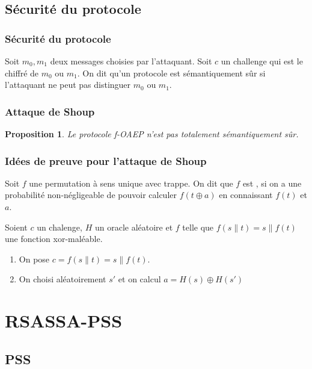 \documentclass[10pt]{beamer}
\theoremstyle{plain}
\newtheorem{proposition}[theoreme]{Proposition}
\theoremstyle{definition}
\theoremstyle{remark}
\begin{document}
\subsection{Sécurité du protocole}
\begin{frame}
\frametitle{Sécurité du protocole}
\transwipe
\begin{definition}
Soit $m_{0}, m_{1}$ deux messages choisies par l'attaquant.
Soit $c$ un challenge qui est le chiffré de $m_{0}$ ou $m_{1}$. On dit qu'un protocole est sémantiquement sûr si l'attaquant ne peut pas distinguer $m_{0}$ ou $m_{1}$.
\end{definition}
\end{frame}
\begin{frame}
\frametitle{Attaque de Shoup}
\transwipe
\begin{proposition}
	Le protocole f-OAEP n'est pas totalement sémantiquement sûr. 
\end{proposition}
\end{frame}
\begin{frame}[shrink]
\frametitle{Idées de preuve pour l'attaque de Shoup}
\transwipe
\begin{definition}
Soit $f$ une permutation à sens unique avec trappe.
On dit que $f$ est , si on a une probabilité non-négligeable de pouvoir calculer $f(t\oplus a)$ en connaissant $f(t)$ et $a$.
\end{definition}
Soient $c$ un chalenge, $H$ un oracle aléatoire et $f$ telle que $f(s\parallel t) = s\parallel f(t)$ une fonction xor-maléable.
\begin{enumerate}
\item On pose $c = f(s\parallel t)= s\parallel f(t)$.
\item On choisi aléatoirement $s'$ et on calcul $a=H(s)\oplus H(s')$
\end{enumerate}
\end{frame}
\section{RSASSA-PSS}
\subsection{PSS}
\begin{frame}
\transwipe

\end{frame}
\end{document}
